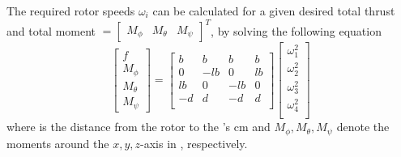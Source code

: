 The required rotor speeds $ \omega_i $ can be calculated for a given desired total thrust  and total moment $=\begin{bmatrix}	M_\phi&M_\theta&M_\psi	\end{bmatrix}^T  $, by solving the following equation
\begin{equation}\label{eq:omega_i}
\begin{bmatrix}
f\\M_\phi\\M_\theta\\M_\psi
\end{bmatrix}=
\begin{bmatrix}
b&b&b&b\\
0&-lb&0&lb\\
lb&0&-lb&0\\
-d&d&-d&d\\
\end{bmatrix}
\begin{bmatrix}
\omega_1^2\\
\omega_2^2\\
\omega_3^2\\
\omega_4^2\\
\end{bmatrix}
\end{equation}
where  is the distance from the rotor to the 's \acf{cm} and $ M_\phi, M_\theta, M_\psi $ denote the moments around the $ x, y, z $-axis in \BF, respectively. 

